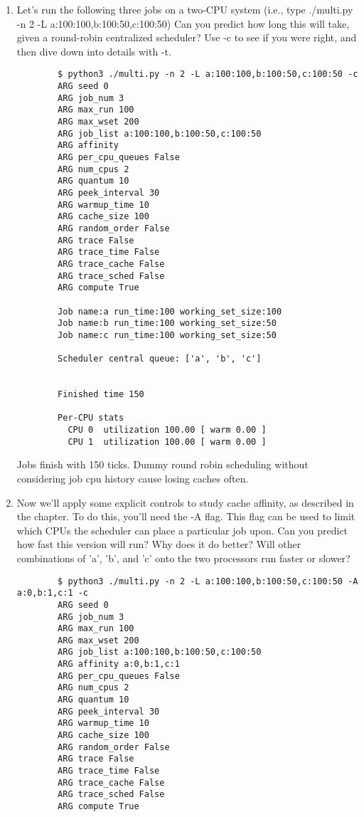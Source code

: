 \documentclass{article}
\begin{document}
\begin{enumerate}[label=\textbf{\arabic*}), start=5]
    \item Let's run the following three jobs on a two-CPU system
    (i.e., type ./multi.py -n 2 -L a:100:100,b:100:50,c:100:50)
    Can you predict how long this will take, given a round-robin
    centralized scheduler? Use -c to see if you were right, and
    then dive down into details with -t.
    {\scriptsize
    \begin{verbatim}
        $ python3 ./multi.py -n 2 -L a:100:100,b:100:50,c:100:50 -c
        ARG seed 0
        ARG job_num 3
        ARG max_run 100
        ARG max_wset 200
        ARG job_list a:100:100,b:100:50,c:100:50
        ARG affinity 
        ARG per_cpu_queues False
        ARG num_cpus 2
        ARG quantum 10
        ARG peek_interval 30
        ARG warmup_time 10
        ARG cache_size 100
        ARG random_order False
        ARG trace False
        ARG trace_time False
        ARG trace_cache False
        ARG trace_sched False
        ARG compute True
        
        Job name:a run_time:100 working_set_size:100
        Job name:b run_time:100 working_set_size:50
        Job name:c run_time:100 working_set_size:50
        
        Scheduler central queue: ['a', 'b', 'c']
        
        
        Finished time 150
        
        Per-CPU stats
          CPU 0  utilization 100.00 [ warm 0.00 ]
          CPU 1  utilization 100.00 [ warm 0.00 ]
    \end{verbatim}
    }
    Jobs finish with 150 ticks. Dummy round robin scheduling without
    considering job cpu history cause losing caches often.

\newpage
    \item Now we’ll apply some explicit controls to study
    cache affinity, as described in the chapter. To do this,
    you'll need the -A flag. This flag can be used to limit which
    CPUs the scheduler can place a particular job upon.
    Can you predict how fast this version will run? Why does it
    do better? Will other combinations of 'a', 'b', and 'c' onto
    the two processors run faster or slower?
    {\scriptsize
    \begin{verbatim}
        $ python3 ./multi.py -n 2 -L a:100:100,b:100:50,c:100:50 -A a:0,b:1,c:1 -c
        ARG seed 0
        ARG job_num 3
        ARG max_run 100
        ARG max_wset 200
        ARG job_list a:100:100,b:100:50,c:100:50
        ARG affinity a:0,b:1,c:1
        ARG per_cpu_queues False
        ARG num_cpus 2
        ARG quantum 10
        ARG peek_interval 30
        ARG warmup_time 10
        ARG cache_size 100
        ARG random_order False
        ARG trace False
        ARG trace_time False
        ARG trace_cache False
        ARG trace_sched False
        ARG compute True
        

\end{verbatim}}
\end{enumerate}
\end{document}
